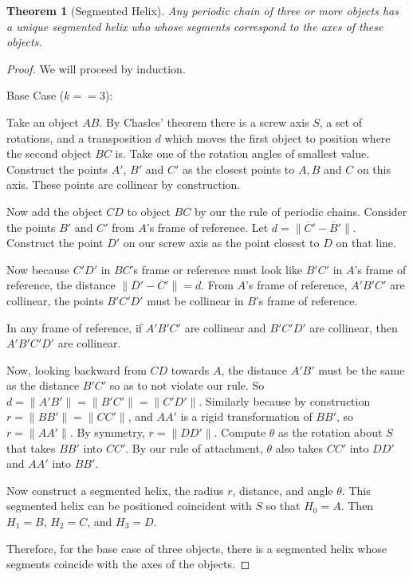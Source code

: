 \documentclass[11pt]{article}
\newtheorem{theorem}{Theorem}
\begin{document}
{\begin{theorem}[Segmented Helix]
  Any periodic chain of three or more objects has a unique segmented helix who
  whose segments correspond
  to the axes of these objects.
\end{theorem}

\begin{proof}
  We will proceed by induction.

  Base Case ($k == 3$):

  Take an object $AB$. By Chasles' theorem\cite{wiki:chasles}
    there is a screw axis $S$, a set of rotations,  and a transposition $d$ which moves the first object to
    position where the second object $BC$ is. Take one of the rotation angles of smallest value.
    Construct the points $A'$, $B'$ and $C'$ as the closest points
  to $A,B$ and $C$ on this axis. These points are collinear by construction.

  Now add the object $CD$ to object $BC$ by our the rule of periodic chains. Consider the points
  $B'$ and $C'$ from $A$'s frame of reference. Let $d = \| \overline C' - \overline B' \|$.
  Construct the point $D'$ on our screw axis as the point closest to $D$ on that line.

  Now because $C'D'$ in $BC$'s frame or reference must look like $B'C'$ in $A$'s frame of reference,
  the distance $\| \overline D' - \overline C' \| = d$.
  From $A$'s frame of reference, $A'B'C'$ are collinear, the points $B'C'D'$ must be collinear in
  $B$'s frame of reference.

  In any frame of reference, if $A'B'C'$ are collinear and $B'C'D'$ are collinear, then $A'B'C'D'$
  are collinear.

  Now, looking backward from $CD$ towards $A$, the distance $A'B'$ must be the same as the
  distance $B'C'$ so as to not violate our rule. So $d = \| A'B' \| = \| B'C' \| = \| C'D'\|$.
  Similarly because by construction $r = \| B B' \| = \| C C' \|$, and $AA'$ is a rigid
  transformation of $BB'$, so $r = \| A A' \|$. By symmetry, $r = \| D D' \|$.
  Compute $\theta$ as the rotation about $S$ that takes $B B'$ into $C C'$. By our rule
  of attachment, $\theta$ also takes $C C'$ into $D D'$ and $A A'$ into $B B'$.

  Now construct a segmented helix, the radius $r$, distance,
  and angle $\theta$. This segmented helix can be positioned coincident with $S$ so
  that $H_0 = A$. Then $H_1=B$, $H_2=C$, and $H_3=D$.

  Therefore, for the base case of three objects, there is a segmented helix whose
  segments coincide with the axes of the objects.



\end{proof}}
\end{document}
